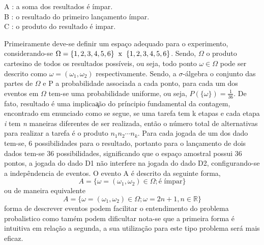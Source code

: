   \vspace{0.5cm}
  \hspace{4cm}
  \begin{minipage}{9cm}
	 A : a soma dos resultados \'{e} \'{i}mpar. \\
	 B : o resultado do primeiro lan\c{c}amento \'{i}mpar. \\
	 C : o produto do resultado \'{e} impar.
  \end{minipage}
  \vspace{0.5cm}
  \par
  Primeiramente deve-se definir um espa\c{c}o adequado para o experimento, considerando-se
  $\Omega = \{1,2,3,4,5,6 \} \hspace{2mm} \text{x} \hspace{2mm} \{1,2,3,4,5,6 \}$. Sendo, $\Omega$ o produto cartesino de todos os resultados
  poss\'{i}veis, ou seja, todo ponto $\omega \in \Omega$ pode ser descrito como $\omega = (\omega_1, \omega_2)$ respectivamente. 
  Sendo, a $\sigma$-\'{a}lgebra  o conjunto das partes de $\Omega$ e P a probabilidade associada a cada ponto, para cada um dos 
  eventos em $\Omega$ tem-se uma probabilidade uniforme, ou seja, $P(\{\omega \}) = \frac {1}{36}$. De fato, resultado \'{e} 
  uma implica\c{a}\~{a}o do pr\'{i}ncipio fundamental da contagem, encontrado em \cite{magalhaes} enunciado como se segue,
  se uma tarefa tem k etapas e cada etapa \textit{i} tem \textit{n} maneiras diferentes de ser realizada, ent\~{a}o  o n\'{u}mero total
  de alternativas para realizar a tarefa \'{e} o produto $n_1 n_2 \cdots n_k$. Para cada jogada de um dos dado tem-se, 6 possibilidades
  para o resultado, portanto para o lan\c{c}amento de dois dados tem-se 36 possibilidades, significando que o espa\c{c}o amostral
  possui 36 pontos, a jogada do dado D1 n\~{a}o interfere na jogada do dado D2, configurando-se a indep\^{e}ndencia de eventos. 
  O evento A \'{e} descrito da seguinte forma,
  \begin{equation*}
	A = \{ \omega = (\omega_1,\omega_2) \in \Omega; \textrm{\'{e} \'{i}mpar} \}
  \end{equation*}
  ou de maneira equivalente
  \begin{equation*}
	A = \{ \omega = (\omega_1,\omega_2) \in \Omega; \omega = 2n + 1, n \in \mathbb{R} \} 
  \end{equation*}
  forma de descrever eventos podem facilitar o entendimento do problema probalistico como tam\'{e}m podem dificultar nota-se que a primeira
  forma \'{e} intuitiva em rela\c{c}\~{a}o a segunda, a sua utiliza\c{c}\~{a}o para este tipo problema ser\'{a} mais eficaz. 
